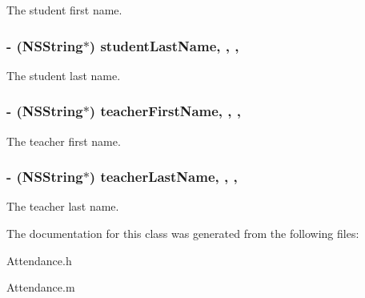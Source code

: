 The student first name. \hypertarget{interface_attendance_a0750a37e87bdcd6e188846b174faf211}{
\subsubsection[{student\+Last\+Name}]{\setlength{\rightskip}{0pt plus 5cm}-\/ (N\+S\+String$\ast$) student\+Last\+Name\hspace{0.3cm}{\ttfamily [read]}, {\ttfamily [write]}, {\ttfamily [nonatomic]}, {\ttfamily [assign]}}}\label{interface_attendance_a0750a37e87bdcd6e188846b174faf211}
The student last name. \hypertarget{interface_attendance_aa8205f78bffac5fd2dd3ce2a44ef1e96}{
\subsubsection[{teacher\+First\+Name}]{\setlength{\rightskip}{0pt plus 5cm}-\/ (N\+S\+String$\ast$) teacher\+First\+Name\hspace{0.3cm}{\ttfamily [read]}, {\ttfamily [write]}, {\ttfamily [nonatomic]}, {\ttfamily [assign]}}}\label{interface_attendance_aa8205f78bffac5fd2dd3ce2a44ef1e96}
The teacher first name. \hypertarget{interface_attendance_ad532e084c8758266e0106649e4f5605e}{
\subsubsection[{teacher\+Last\+Name}]{\setlength{\rightskip}{0pt plus 5cm}-\/ (N\+S\+String$\ast$) teacher\+Last\+Name\hspace{0.3cm}{\ttfamily [read]}, {\ttfamily [write]}, {\ttfamily [nonatomic]}, {\ttfamily [assign]}}}\label{interface_attendance_ad532e084c8758266e0106649e4f5605e}
The teacher last name. 

The documentation for this class was generated from the following files\+:\begin{DoxyCompactItemize}
\item 
Attendance.\+h\item 
Attendance.\+m\end{DoxyCompactItemize}
